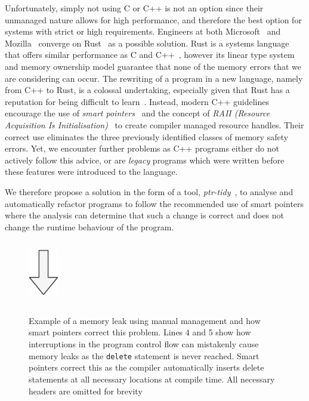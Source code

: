 \documentclass{mpaper}
\begin{document}
    
    Unfortunately, simply not using C or C++ is not an option since their unmanaged nature allows for high performance, and therefore the best option for systems with strict or high requirements.
    Engineers at both Microsoft~\cite{Thomas2019} and Mozilla~\cite{Hostfelt2019} converge on Rust~\cite{Balasubramanian2017} as a possible solution.
    Rust is a systems language that offers similar performance as C and C++~\cite{Lin2016}, however its linear type system and memory ownership model guarantee that none of the memory errors that we are considering can occur.
    The rewriting of a program in a new language, namely from C++ to Rust, is a colossal undertaking, especially given that Rust has a reputation for being difficult to learn~\cite{Astrauskas2019}.
    Instead, modern C++ guidelines encourage the use of \emph{smart pointers}~\cite{Dimov2003} and the concept of \emph{RAII (Resource Acquisition Is Initialisation)}~\cite{Stroustrup2000} to create compiler managed resource handles.
    Their correct use eliminates the three previously identified classes of memory safety errors.
    Yet, we encounter further problems as C++ programs either do not actively follow this advice, or are \emph{legacy} programs which were written before these features were introduced to the language.
    
    We therefore propose a solution in the form of a tool, \emph{ptr-tidy}~\cite{Usov2021}, to analyse and automatically refactor programs to follow the recommended use of smart pointers where the analysis can determine that such a change is correct and does not change the runtime behaviour of the program. 
    
    \begin{figure}[t]
        \centering
        \inputminted{c++}{code/leak.cpp}
        \includegraphics{images/arrow.pdf}
        \inputminted{c++}{code/fix-leak.cpp}
        \caption{Example of a memory leak using manual management and how smart pointers correct this problem. Lines 4 and 5 show how interruptions in the program control flow can mistakenly cause memory leaks as the \texttt{delete} statement is never reached. Smart pointers correct this as the compiler automatically inserts delete statements at all necessary locations at compile time. All necessary headers are omitted for brevity}
        \label{lst:motivating-example}
    \end{figure}
    
\end{document}
